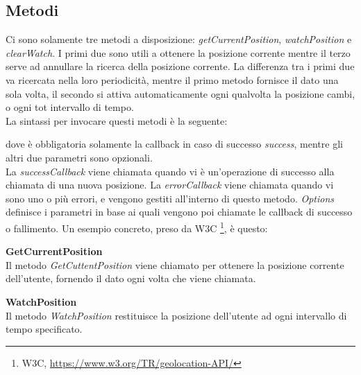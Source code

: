 \documentclass[11pt ,a4paper , twoside , openright ]{book}
\begin{document}
	\subsection{Metodi}
	Ci sono solamente tre metodi a disposizione: \textit{getCurrentPosition}, \textit{watchPosition} e \textit{clearWatch}. I primi due sono utili a ottenere la posizione corrente mentre il terzo serve ad annullare la ricerca della posizione corrente. 
	La differenza tra i primi due va ricercata nella loro periodicità, mentre il primo metodo fornisce il dato una sola volta, il secondo si attiva automaticamente ogni qualvolta la posizione cambi, o ogni tot intervallo di tempo.
	\\
	La sintassi per invocare questi metodi è la seguente:
	
	dove è obbligatoria solamente la callback in caso di successo \textit{success}, mentre gli altri due parametri sono opzionali.
	\\
	La \textit{successCallback} viene chiamata quando vi è un'operazione di successo alla chiamata di una nuova posizione.
	La \textit{errorCallback} viene chiamata quando vi sono uno o più errori, e vengono gestiti all'interno di questo metodo.
	\textit{Options} definisce i parametri in base ai quali vengono poi chiamate le callback di successo o fallimento.
	Un esempio concreto, preso da W3C \footnote{W3C, \url{https://www.w3.org/TR/geolocation-API/}}, è questo:
	\pagebreak
	 
	
	\textbf{GetCurrentPosition}
	\\
	Il metodo \textit{GetCuttentPosition} viene chiamato per ottenere la posizione corrente dell'utente, fornendo il dato ogni volta che viene chiamata.
	
	\textbf{WatchPosition}
	\\
	Il metodo \textit{WatchPosition} restituisce la posizione dell'utente ad ogni intervallo di tempo specificato.
	
\end{document}
